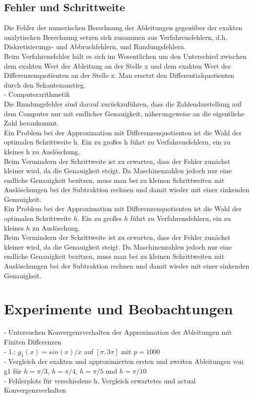 \documentclass{scrartcl}
\begin{document}
\subsection{Fehler und Schrittweite}
\label{ssec:schrittweite}
Die Fehler der numerischen Berechnung der Ableitungen gegenüber der exakten analytischen Berechnung setzen sich zusammen aus Verfahrensfehlern, d.h. Diskretisierungs- und Abbruchfehlern, und Rundungsfehlern.\\
Beim Verfahrensfehler hält es sich im Wesentlichen um den Unterschied zwischen dem exakten Wert der Ableitung an der Stelle x und dem exakten Wert des Differenzenquotienten an der Stelle x. Man ersetzt den Differentialquotienten durch den Sekantenanstieg.\\
- Computerarithmetik\\
Die Rundungsfehler sind darauf zurückzuführen, dass die Zahlendarstellung auf dem Computer nur mit endlicher Genauigkeit, näherungsweise an die eigentliche Zahl herankommt. \\

Ein Problem bei der Approximation mit Differenzenquotienten ist die Wahl der optimalen Schrittweite h. Ein zu großes h führt zu Verfahrensfehlern, ein zu kleines h zu Auslöschung.\\
Beim Vermindern der Schrittweite ist zu erwarten, dass der Fehler zunächst kleiner wird, da die Genauigkeit steigt. Da Maschinenzahlen jedoch nur eine endliche Genauigkeit bezitzen, muss man bei zu kleinen Schrittweiten mit Auslöschungen bei der Subtraktion rechnen und damit wieder mit einer sinkenden Genauigkeit. \\
Ein Problem bei der Approximation mit Differenzenquotienten ist die Wahl der optimalen Schrittweite $h$. Ein zu großes $h$ führt zu Verfahrensfehlern, ein zu kleines $h$ zu Auslöschung.\\
Beim Vermindern der Schrittweite ist zu erwarten, dass der Fehler zunächst kleiner wird, da die Genauigkeit steigt. Da Maschinenzahlen jedoch nur eine endliche Genauigkeit bezitzen, muss man bei zu kleinen Schrittweiten mit Auslöschungen bei der Subtraktion rechnen und damit wieder mit einer sinkenden Genauigkeit.

\pagebreak \section{Experimente und Beobachtungen}
\label{sec:experimente}
- Untersuchen Konvergenzverhalten der Approximation der Ableitungen mit Finiten Differenzen\\
- 1.: $g_1(x)=sin(x)/x$ auf $[\pi,3\pi]$ mit $p=1000$\\
- Vergleich der exakten und approximierten ersten und zweiten Ableitungen von g1 für $h = \pi/3$, $h = \pi/4$, $h = \pi/5$ und $h = \pi/10$\\
- Fehlerplots für verschiedene h, Vergleich erwartetes und actual Konvergenzverhalten\\
\end{document}
